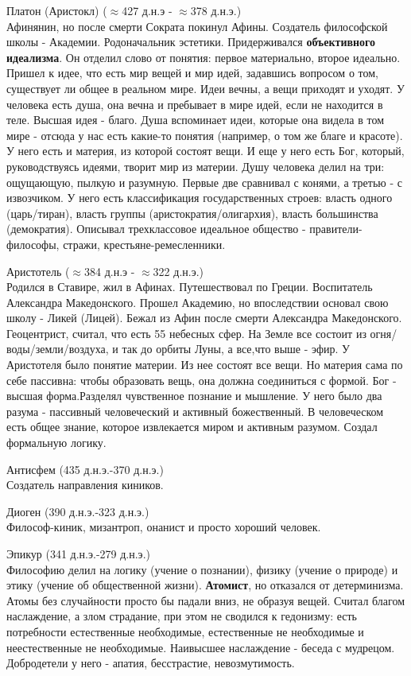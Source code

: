 \documentclass[12pt,a4paper]{article}
\begin{document}
Платон (Аристокл) ($\approx$427 д.н.э - $\approx$378 д.н.э.)\\
Афинянин, но после смерти Сократа покинул Афины. Создатель философской школы - Академии. Родоначальник эстетики. Придерживался \textbf{объективного идеализма}. Он отделил слово от понятия: первое материально, второе идеально. Пришел к идее, что есть мир вещей и мир идей, задавшись вопросом о том, существует ли общее в реальном мире. Идеи вечны, а вещи приходят и уходят. У человека есть душа, она вечна и пребывает в мире идей, если не находится в теле. Высшая идея - благо. Душа вспоминает идеи, которые она видела в том мире - отсюда у нас есть какие-то понятия (например, о том же благе и красоте). У него есть и материя, из которой состоят вещи. И еще у него есть Бог, который, руководствуясь идеями, творит мир из материи. Душу человека делил на три: ощущающую, пылкую и разумную. Первые две сравнивал с конями, а третью - с извозчиком. У него есть классификация государственных строев: власть одного (царь/тиран), власть группы (аристократия/олигархия), власть большинства (демократия). Описывал трехклассовое идеальное общество - правители-философы, стражи, крестьяне-ремесленники.

Аристотель ($\approx$384 д.н.э - $\approx$322 д.н.э.)\\
Родился в Ставире, жил в Афинах. Путешествовал по Греции. Воспитатель Александра Македонского. Прошел Академию, но впоследствии основал свою школу - Ликей (Лицей). Бежал из Афин после смерти Александра Македонского. Геоцентрист, считал, что есть 55 небесных сфер. На Земле все состоит из огня/воды/земли/воздуха, и так до орбиты Луны, а все,что выше - эфир. У Аристотеля было понятие материи. Из нее состоят все вещи. Но материя сама по себе пассивна: чтобы образовать вещь, она должна соединиться с формой. Бог - высшая форма.Разделял чувственное познание и мышление. У него было два разума - пассивный человеческий и активный божественный. В человеческом есть общее знание, которое извлекается миром и активным разумом. Создал формальную логику.

Антисфем (435 д.н.э.-370 д.н.э.)\\
Создатель направления киников.

Диоген (390 д.н.э.-323 д.н.э.)\\ 
Философ-киник, мизантроп, онанист и просто хороший человек.

Эпикур (341 д.н.э.-279 д.н.э.)\\
Философию делил на логику (учение о познании), физику (учение о природе) и этику (учение об общественной жизни). \textbf{Атомист}, но отказался от детерминизма. Атомы без случайности просто бы падали вниз, не образуя вещей. Считал благом наслаждение, а злом страдание, при этом не сводился к гедонизму: есть потребности естественные необходимые, естественные не необходимые и неестественные не необходимые. Наивысшее наслаждение - беседа с мудрецом. Добродетели у него - апатия, бесстрастие, невозмутимость.
\end{document}

